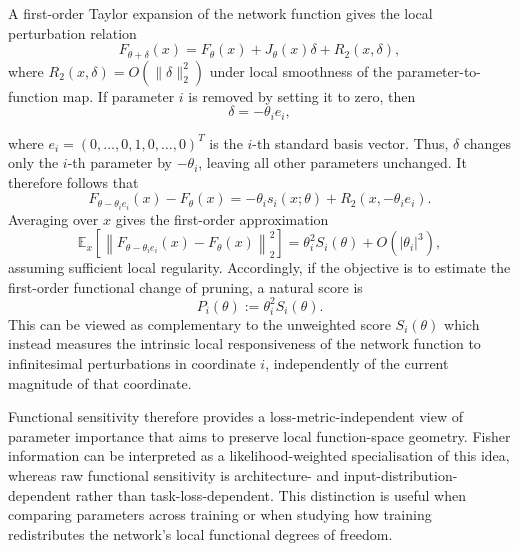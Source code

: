 \documentclass{article}
\theoremstyle{definition}
\theoremstyle{remark}
\begin{document}
A first-order Taylor expansion of the network function gives the local perturbation relation
\begin{equation}
    F_{\theta+\delta}(x)
    =
    F_\theta(x)
    +
    J_\theta(x)\delta
    +
    R_2(x,\delta),
\end{equation}
where \(R_2(x,\delta)=O(\|\delta\|_2^2)\) under local smoothness of the parameter-to-function map. If parameter \(i\) is removed by setting it to zero, then
\[
    \delta=-\theta_i e_i,
\]

where $ e_i = (0,\ldots,0,1,0,\ldots,0)^T $
is the \(i\)-th standard basis vector. Thus, \(\delta\) changes only the \(i\)-th parameter by \(-\theta_i\), leaving all other parameters unchanged. It therefore follows that
\begin{equation}
    F_{\theta-\theta_i e_i}(x)-F_\theta(x)
    =
    -\theta_i s_i(x;\theta)
    +
    R_2(x,-\theta_i e_i).
\end{equation}
Averaging over \(x\) gives the first-order approximation
\begin{equation}
    \mathbb E_x
    \left[
        \left\|
            F_{\theta-\theta_i e_i}(x)-F_\theta(x)
        \right\|_2^2
    \right]
    =
    \theta_i^2 S_i(\theta)
    +
    O(|\theta_i|^3),
    \label{eq:pruning-perturbation}
\end{equation}
assuming sufficient local regularity. Accordingly, if the objective is to estimate the first-order functional change of pruning, a natural score is
\begin{equation}
    P_i(\theta)
    :=
    \theta_i^2 S_i(\theta).
\end{equation}
This can be viewed as complementary to the unweighted score \(S_i(\theta)\) which instead measures the intrinsic local responsiveness of the network function to infinitesimal perturbations in coordinate \(i\), independently of the current magnitude of that coordinate.

Functional sensitivity therefore provides a loss-metric-independent view of parameter importance that aims to preserve local function-space geometry. Fisher information can be interpreted as a likelihood-weighted specialisation of this idea, whereas raw functional sensitivity is architecture- and input-distribution-dependent rather than task-loss-dependent. This distinction is useful when comparing parameters across training or when studying how training redistributes the network's local functional degrees of freedom.
\end{document}
